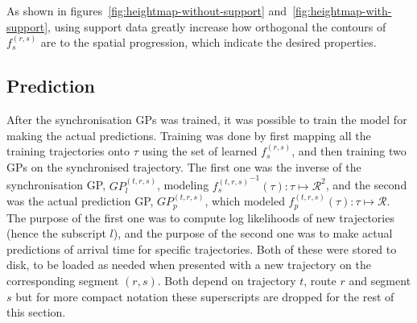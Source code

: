 \noindent
As shown in figures~\ref{fig:heightmap-without-support} and~\ref{fig:heightmap-with-support}, using support data greatly increase how orthogonal the contours of $f^{(r,s)}_s$ are to the spatial progression, which indicate the desired properties.

\subsection{Prediction}
After the synchronisation GPs was trained, it was possible to train
the model for making the actual predictions. Training was done by
first mapping all the training trajectories onto $\tau$ using the set
of learned  $f^{(r,s)}_s$, and then training two GPs on the
synchronised trajectory. The first one was the inverse of the
synchronisation GP, ${GP_l^{(t, r,s)}}$, modeling
${f^{(t,r,s)}_s}^{-1}(\tau) : \tau \mapsto \mathcal{R}^2$,
and the second
was the actual prediction GP, $GP_p^{(t,r,s)}$, which modeled
${f^{(t,r,s)}_p}(\tau) : \tau \mapsto \mathcal{R}$. The purpose
of the first one was to compute log likelihoods of new trajectories
(hence the subscript $l$), and
the purpose of the second one was to make actual predictions of
arrival time for specific trajectories. Both of these were stored to
disk, to be loaded as needed when presented with a new trajectory on
the corresponding segment $(r, s)$. Both depend on trajectory
$t$, route $r$ and segment $s$ but for more compact notation these
superscripts are dropped for the rest of this section.

